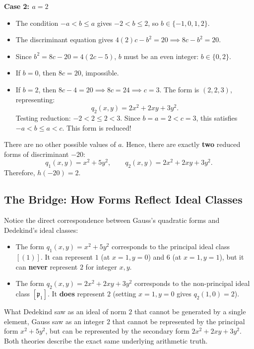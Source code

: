 \documentclass[a4paper]{article}
\begin{document}
\noindent\textbf{Case 2: $a = 2$}
\begin{itemize}
 \item The condition $-a < b \le a$ gives $-2 < b \le 2$, so $b \in \{-1, 0, 1, 2\}$.
 \item The discriminant equation gives $4(2)c - b^2 = 20 \implies 8c - b^2 = 20$.
 \item Since $b^2 = 8c - 20 = 4(2c - 5)$, $b$ must be an even integer: $b \in \{0, 2\}$.
 \item If $b = 0$, then $8c = 20$, impossible.
 \item If $b = 2$, then $8c - 4 = 20 \implies 8c = 24 \implies c = 3$. The form is $(2, 2, 3)$, representing:
 \begin{equation}
  q_2(x, y) = 2x^2 + 2xy + 3y^2.
 \end{equation}
 Testing reduction: $-2 < 2 \le 2 < 3$. Since $b = a = 2 < c = 3$, this satisfies $-a < b \le a < c$. This form is reduced!
\end{itemize}

There are no other possible values of $a$. Hence, there are exactly \textbf{two} reduced forms of discriminant $-20$:
\begin{equation}
 \boxed{q_1(x, y) = x^2 + 5y^2, \qquad q_2(x, y) = 2x^2 + 2xy + 3y^2}.
\end{equation}
Therefore, $h(-20) = 2$.

\subsection{The Bridge: How Forms Reflect Ideal Classes}
Notice the direct correspondence between Gauss's quadratic forms and Dedekind's ideal classes:
\begin{itemize}[leftmargin=2em]
 \item The form $q_1(x, y) = x^2 + 5y^2$ corresponds to the principal ideal class $[(1)]$. It can represent $1$ (at $x=1, y=0$) and $6$ (at $x=1, y=1$), but it can \textbf{never} represent $2$ for integer $x, y$.
 \item The form $q_2(x, y) = 2x^2 + 2xy + 3y^2$ corresponds to the non-principal ideal class $[\mathfrak{p}_1]$. It \textbf{does} represent $2$ (setting $x=1, y=0$ gives $q_2(1, 0) = 2$).
\end{itemize}
What Dedekind saw as an ideal of norm $2$ that cannot be generated by a single element, Gauss saw as an integer $2$ that cannot be represented by the principal form $x^2 + 5y^2$, but can be represented by the secondary form $2x^2 + 2xy + 3y^2$. Both theories describe the exact same underlying arithmetic truth.
\end{document}
